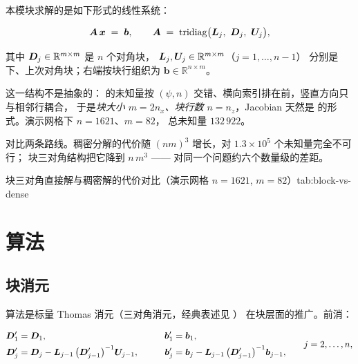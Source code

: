 本模块求解的是如下形式的线性系统：

\begin{equation}
\mat{A}\,\bm{x} \;=\; \bm{b},
\qquad
\mat{A} \;=\; \operatorname{tridiag}\bigl(\mat{L}_j,\ \mat{D}_j,\ \mat{U}_j\bigr),
\label{eq:block-system}
\end{equation}

其中 $\bm{D}_j\in\mathbb{R}^{m\times m}$ 是 $n$ 个对角块，
$\bm{L}_j,\bm{U}_j\in\mathbb{R}^{m\times m}$（$j=1,\dots,n-1$）
分别是下、上次对角块；右端按块行组织为 $\bm{b}\in\mathbb{R}^{n\times m}$。

这一结构不是抽象的： 的未知量按
$(\psi,n)$ 交错、横向索引排在前，竖直方向只与相邻行耦合，
于是\emph{块大小 $m=2n_x$、块行数 $n=n_z$}，Jacobian 天然是
 的形式。演示网格下 $n=1621$、$m=82$，
总未知量 $132\,922$。

 对比两条路线。稠密分解的代价随
$(nm)^{3}$ 增长，对 $1.3\times10^{5}$ 个未知量完全不可行；
块三对角结构把它降到 $n\,m^{3}$ —— 对同一个问题约六个数量级的差距。

\begin{veriftable}{块三对角直接解与稠密解的代价对比（演示网格 $n=1621$, $m=82$）}{tab:block-vs-dense}
\end{veriftable}

\section{算法}
\label{sec:block-algorithm}

\subsection{块消元}

算法是标量 Thomas 消元（三对角消元，经典表述见 \cite{golub2013}）
在块层面的推广。前消：

\begin{equation}
\begin{aligned}
\bm{D}'_1 &= \bm{D}_1, &\qquad \bm{b}'_1 &= \bm{b}_1,\\
\bm{D}'_j &= \bm{D}_j - \bm{L}_{j-1}\,\bigl(\bm{D}'_{j-1}\bigr)^{-1}\bm{U}_{j-1},
&\qquad
\bm{b}'_j &= \bm{b}_j - \bm{L}_{j-1}\,\bigl(\bm{D}'_{j-1}\bigr)^{-1}\bm{b}_{j-1},
\end{aligned}
\qquad j=2,\dots,n,
\label{eq:block-forward}
\end{equation}

